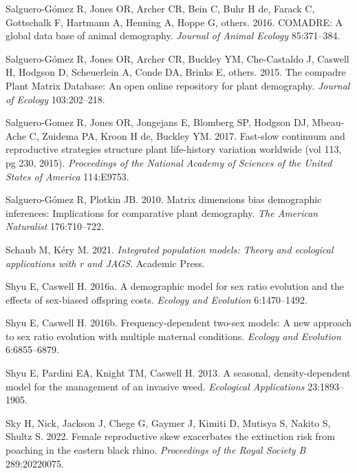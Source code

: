 \documentclass[
  12pt,
  letterpaper,
]{book}
\newlength{\cslhangindent}
\newenvironment{CSLReferences}[2] %
 {\begin{list}{}{%
  \setlength{\itemindent}{0pt}
  \setlength{\leftmargin}{0pt}
  \setlength{\parsep}{0pt}
  \ifodd #1
   \setlength{\leftmargin}{\cslhangindent}
   \setlength{\itemindent}{-1\cslhangindent}
  \fi
  \setlength{\itemsep}{#2\baselineskip}}}
 {\end{list}}
\begin{document}
\begin{CSLReferences}{1}{0}
Salguero-Gómez R, Jones OR, Archer CR, Bein C, Buhr H de, Farack C,
Gottschalk F, Hartmann A, Henning A, Hoppe G, others. 2016. COMADRE: A
global data base of animal demography. \emph{Journal of Animal Ecology}
85:371--384.

Salguero-Gómez R, Jones OR, Archer CR, Buckley YM, Che-Castaldo J,
Caswell H, Hodgson D, Scheuerlein A, Conde DA, Brinks E, others. 2015.
The compadre {P}lant {M}atrix {D}atabase: An open online repository for
plant demography. \emph{Journal of Ecology} 103:202--218.

Salguero-Gomez R, Jones OR, Jongejans E, Blomberg SP, Hodgson DJ,
Mbeau-Ache C, Zuidema PA, Kroon H de, Buckley YM. 2017. Fast-slow
continuum and reproductive strategies structure plant life-history
variation worldwide (vol 113, pg 230, 2015). \emph{Proceedings of the
National Academy of Sciences of the United States of America} 114:E9753.

Salguero-Gómez R, Plotkin JB. 2010. Matrix dimensions bias demographic
inferences: Implications for comparative plant demography. \emph{The
American Naturalist} 176:710--722.

Schaub M, Kéry M. 2021. \emph{Integrated population models: Theory and
ecological applications with r and JAGS}. Academic Press.

Shyu E, Caswell H. 2016a. A demographic model for sex ratio evolution
and the effects of sex-biased offspring costs. \emph{Ecology and
Evolution} 6:1470--1492.

Shyu E, Caswell H. 2016b. Frequency-dependent two-sex models: A new
approach to sex ratio evolution with multiple maternal conditions.
\emph{Ecology and Evolution} 6:6855--6879.

Shyu E, Pardini EA, Knight TM, Caswell H. 2013. A seasonal,
density-dependent model for the management of an invasive weed.
\emph{Ecological Applications} 23:1893--1905.

Sky H, Nick, Jackson J, Chege G, Gaymer J, Kimiti D, Mutisya S, Nakito
S, Shultz S. 2022. Female reproductive skew exacerbates the extinction
risk from poaching in the eastern black rhino. \emph{Proceedings of the
Royal Society B} 289:20220075.


\end{CSLReferences}
\end{document}

